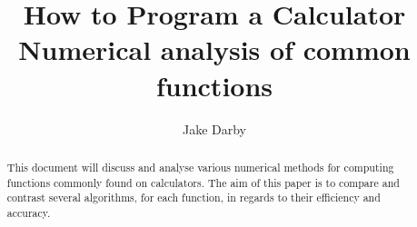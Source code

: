 \documentclass[12pt]{article}
\numberwithin{equation}{subsection}
\begin{document}
\author{Jake Darby}
\title{How to Program a Calculator \\ \large Numerical analysis of common functions}
\date{}
\maketitle

\begin{abstract}
\begin{center}
This document will discuss and analyse various numerical methods for computing functions commonly found on calculators. The aim of this paper is to compare and contrast several algorithms, for each function, in regards to their efficiency and accuracy.
\end{center}
\end{abstract}

\newpage
\tableofcontents
\newpage



%





\nocite{*}
\printbibliography

\appendix

\end{document}
